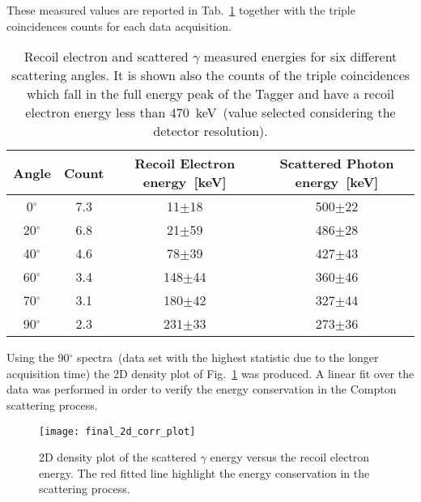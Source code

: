 These measured values are reported in Tab.~\ref{Tab:Scattering_energy} together with the triple coincidences counts for each data acquisition.

\begin{table}[H]
	\centering
	\begin{tabular}{cccc}
		\toprule
		\toprule
		Angle & Count & Recoil Electron energy~[keV] & Scattered Photon energy~[keV] \\
		\midrule
		  0$^\circ$ & 7.3 &   11$\pm$18 &  500$\pm$22\\
		20$^\circ$ & 6.8 &   21$\pm$59 &  486$\pm$28\\
		40$^\circ$ & 4.6 &   78$\pm$39 &  427$\pm$43\\
		60$^\circ$ & 3.4 & 148$\pm$44 &  360$\pm$46\\
		70$^\circ$ & 3.1 & 180$\pm$42 &  327$\pm$44\\
		90$^\circ$ & 2.3 & 231$\pm$33 &  273$\pm$36\\
		\bottomrule
		\bottomrule
	\end{tabular}
	\caption{Recoil electron and scattered $\gamma$ measured energies for six different scattering angles. It is shown also the counts of the triple coincidences which fall in the full energy peak of the Tagger and have a recoil electron energy less than 470~keV~(value selected considering the detector resolution).}
	\label{Tab:Scattering_energy}
\end{table}

Using the 90$^\circ$ spectra~(data set with the highest statistic due to the longer acquisition time) the 2D density plot of Fig.~\ref{Fig:Correlation_Plot} was produced.  A linear fit over the data was performed in order to verify the energy conservation in the Compton scattering process. 
\begin{figure}[h!]
	\centering
	\texttt{[image: final\_2d\_corr\_plot]}
	\caption{2D density plot of the scattered $\gamma$ energy versus the recoil electron energy. The red fitted line highlight the energy conservation in the scattering process.}
	\label{Fig:Correlation_Plot}
\end{figure}
